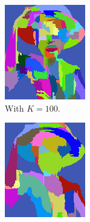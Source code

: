 \begin{figure}[htb!]
\begin{subfigure}{.3\textwidth}
\includegraphics[width=\textwidth]{images/luffyK100.png}
\caption{With $K = 100$.}
\label{fig:smallKSegmentation}
\end{subfigure}
\begin{subfigure}{.3\textwidth}
\includegraphics[width=\textwidth]{images/luffyK1000.png}

\end{subfigure}
\end{figure}
